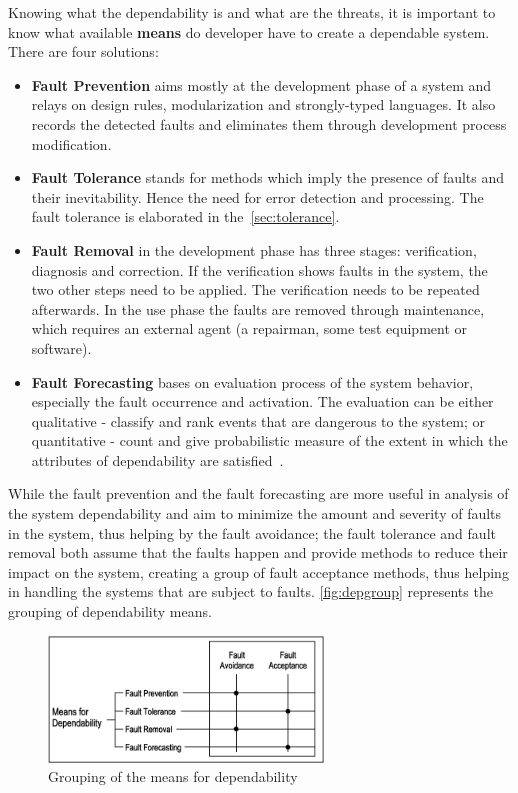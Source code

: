 Knowing what the dependability is and what are the threats, it is important to know what available \textbf{means} do developer have to create a dependable system. There are four solutions:
\begin{itemize}
    \item \textbf{Fault Prevention} aims mostly at the development phase of a system and relays on design rules, modularization and strongly-typed languages. It also records the detected faults and eliminates them through development process modification.
    \item \textbf{Fault Tolerance} stands for methods which imply the presence of faults and their inevitability. Hence the need for error detection and processing. The fault tolerance is elaborated in the~\autoref{sec:tolerance}.
    \item \textbf{Fault Removal} in the development phase has three stages: verification, diagnosis and correction. If the verification shows faults in the system, the two other steps need to be applied. The verification needs to be repeated afterwards. In the use phase the faults are removed through maintenance, which requires an external agent (a repairman, some test equipment or software).
    \item \textbf{Fault Forecasting} bases on evaluation process of the system behavior, especially the fault occurrence and activation. The evaluation can be either qualitative - classify and rank events that are dangerous to the system; or quantitative - count and give probabilistic measure of the extent in which the attributes of dependability are satisfied~\cite{art:Avizienis, art:Avizienis2}. 
\end{itemize}
While the fault prevention and the fault forecasting are more useful in analysis of the system dependability and aim to minimize the amount and severity of faults in the system, thus helping by the fault avoidance; the fault tolerance and fault removal both assume that the faults happen and provide methods to reduce their impact on the system, creating a group of fault acceptance methods, thus helping in handling the systems that are subject to faults. \autoref{fig:depgroup} represents the grouping of dependability means.

\begin{figure}[H]
\centering
\includegraphics[width=0.65\textwidth]{figures/depgroup.png}
\caption{Grouping of the means for dependability~\cite{art:Avizienis}}
\label{fig:depgroup}
\end{figure}

